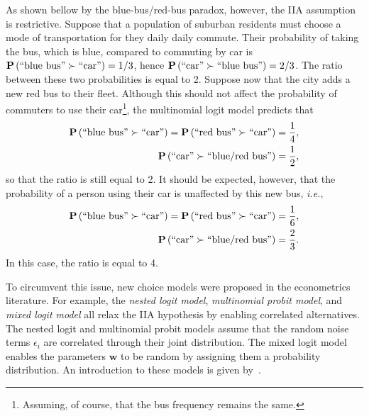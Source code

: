 As shown bellow by the blue-bus/red-bus paradox, however, the IIA assumption is restrictive.
Suppose that a population of suburban residents must choose a mode of transportation for they daily daily commute.
Their probability of taking the bus, which is blue, compared to commuting by car is $\mathbf{P}\left( \text{``blue bus''} \succ \text{``car''} \right) = 1/3$, hence $\mathbf{P}\left( \text{``car''} \succ \text{``blue bus''} \right) = 2/3$.
The ratio between these two probabilities is equal to 2.
Suppose now that the city adds a new red bus to their fleet.
Although this should not affect the probability of commuters to use their car\footnote{Assuming, of course, that the bus frequency remains the same.}, the multinomial logit model predicts that
\begin{align*}
	\mathbf{P}\left( \text{``blue bus''} \succ \text{``car''} \right) =  \mathbf{P}\left( \text{``red bus''} \succ \text{``car''} \right) & = \frac{1}{4}, \\
	\mathbf{P}\left( \text{``car''} \succ \text{``blue/red bus''} \right)                                               & = \frac{1}{2},
\end{align*}
so that the ratio is still equal to 2.
It should be expected, however, that the probability of a person using their car is unaffected by this new bus, \textit{i.e.},
\begin{align*}
	\mathbf{P}\left( \text{``blue bus''} \succ \text{``car''} \right) =  \mathbf{P}\left( \text{``red bus''} \succ \text{``car''} \right) & = \frac{1}{6}, \\
	\mathbf{P}\left( \text{``car''} \succ \text{``blue/red bus''} \right)                                               & = \frac{2}{3}.
\end{align*}
In this case, the ratio is equal to 4.

To circumvent this issue, new choice models were proposed in the econometrics literature.
For example, the \emph{nested logit model}, \emph{multinomial probit model}, and \emph{mixed logit model} all relax the IIA hypothesis by enabling correlated alternatives.
The nested logit and multinomial probit models assume that the random noise terms $\epsilon_i$ are correlated through their joint distribution.
The mixed logit model enables the parameters $\bm{w}$ to be random by assigning them a probability distribution.
An introduction to these models is given by~\citet{train2009discrete}.

